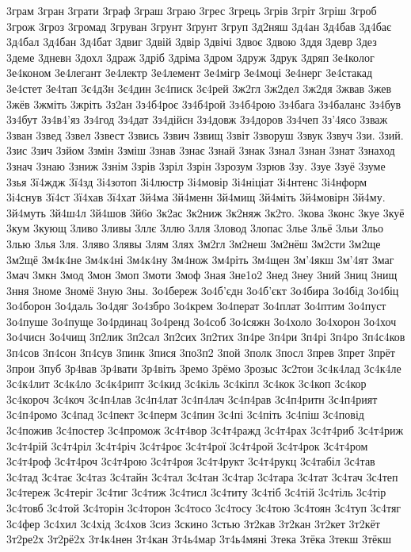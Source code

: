 3грам
3гран
3грати
3граф
3граш
3граю
3грес
3грець
3грів
3гріт
3гріш
3гроб
3грож
3гроз
3громад
3груван
3грунт
3ґрунт
3груп
3д2няш
3д4ан
3д4бав
3д4бає
3д4бал
3д4бан
3д4бат
3двиг
3двій
3двір
3двічі
3двоє
3двою
3ддя
3девр
3дез
3деме
3дневн
3дохл
3драж
3дріб
3дріма
3дром
3друж
3друк
3дряп
3е4колог
3е4коном
3е4легант
3е4лектр
3е4лемент
3е4мігр
3е4моці
3е4нерг
3е4стакад
3е4стет
3е4тап
3є4д3н
3є4дин
3є4писк
3є4рей
3ж2гл
3ж2дел
3ж2дя
3жвав
3жев
3жёв
3жміть
3жріть
3з2ан
3з4б4роє
3з4б4рой
3з4б4рою
3з4бага
3з4баланс
3з4був
3з4бут
3з4в4'яз
3з4год
3з4дат
3з4дійсн
3з4довж
3з4доров
3з4чеп
3з'4ясо
3зваж
3зван
3звед
3звел
3звест
3звись
3звич
3звищ
3звіт
3зворуш
3звук
3звуч
3зи.
3зий.
3зис
3зич
3зйом
3змін
3зміш
3знав
3знає
3знай
3знак
3знал
3знан
3знат
3знаход
3знач
3знаю
3зниж
3знім
3зрів
3зріл
3зрін
3зрозум
3зрюв
3зу.
3зуе
3зуё
3зуме
3зья
3ї4ждж
3ї4зд
3і4зотоп
3і4люстр
3і4мовір
3і4ніціат
3і4нтенс
3і4нформ
3і4снув
3ї4ст
3ї4хав
3ї4хат
3й4ма
3й4менн
3й4мищ
3й4міть
3й4мовірн
3й4му.
3й4муть
3й4ш4л
3й4шов
3й6о
3к2ас
3к2ниж
3к2няж
3к2то.
3кова
3конс
3куе
3куё
3кум
3кующ
3ливо
3ливы
3ллє
3ллю
3лля
3ловод
3лопас
3лье
3льё
3льи
3льо
3лью
3лья
3ля.
3ляво
3лявы
3лям
3лях
3м2гл
3м2неш
3м2нёш
3м2сти
3м2ще
3м2щё
3м4к4не
3м4к4ні
3м4к4ну
3м4нож
3м4ріть
3м4щен
3м'4якш
3м'4ят
3маг
3мач
3мкн
3мод
3мон
3моп
3моти
3моф
3ная
3не1о2
3нед
3неу
3ний
3ниц
3нищ
3ння
3номе
3номё
3ную
3ны.
3о4береж
3о4б'єдн
3о4б'єкт
3о4бира
3о4бід
3о4біц
3о4борон
3о4даль
3о4дяг
3о4збро
3о4крем
3о4перат
3о4плат
3о4птим
3о4пуст
3о4пуше
3о4пуще
3о4рдинац
3о4ренд
3о4соб
3о4сяжн
3о4холо
3о4хорон
3о4хоч
3о4чисн
3о4чищ
3п2лик
3п2сал
3п2сих
3п2тих
3п4ре
3п4ри
3п4рі
3п4ро
3п4с4ков
3п4сов
3п4сон
3п4сув
3пинк
3пися
3по3п2
3пой
3полк
3посл
3прев
3прет
3прёт
3прои
3пуб
3р4вав
3р4вати
3р4віть
3ремо
3рёмо
3розыс
3с2тои
3с4к4лад
3с4к4ле
3с4к4лит
3с4к4ло
3с4к4рипт
3с4кид
3с4кіль
3с4кіпл
3с4кок
3с4коп
3с4кор
3с4короч
3с4коч
3с4п4лав
3с4п4лат
3с4п4лач
3с4п4рав
3с4п4ритн
3с4п4рият
3с4п4ромо
3с4пад
3с4пект
3с4перм
3с4пин
3с4пі
3с4піть
3с4піш
3с4повід
3с4пожив
3с4постер
3с4промож
3с4т4вор
3с4т4ражд
3с4т4рах
3с4т4риб
3с4т4риж
3с4т4рій
3с4т4ріл
3с4т4річ
3с4т4роє
3с4т4рої
3с4т4рой
3с4т4рок
3с4т4ром
3с4т4роф
3с4т4роч
3с4т4рою
3с4т4роя
3с4т4рукт
3с4т4рукц
3с4табіл
3с4тав
3с4тад
3с4тає
3с4таз
3с4тайн
3с4тал
3с4тан
3с4тар
3с4тара
3с4тат
3с4тач
3с4теп
3с4тереж
3с4теріг
3с4тиг
3с4тиж
3с4тисл
3с4титу
3с4тіб
3с4тій
3с4тіль
3с4тір
3с4товб
3с4той
3с4торін
3с4торон
3с4тосо
3с4тосу
3с4тою
3с4тоян
3с4туп
3с4тяг
3с4фер
3с4хил
3с4хід
3с4хов
3сиз
3скино
3стью
3т2кав
3т2кан
3т2кет
3т2кёт
3т2ре2х
3т2рё2х
3т4к4нен
3т4кан
3т4ь4мар
3т4ь4мяні
3тека
3тёка
3текш
3тёкш
